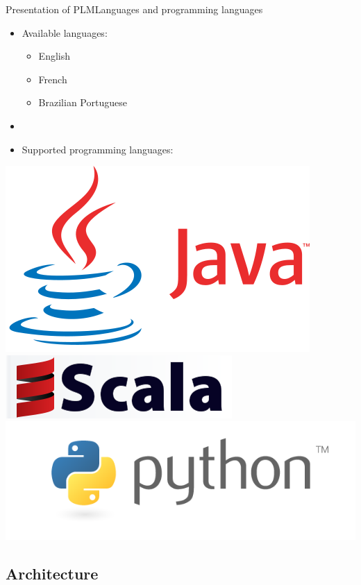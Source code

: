 \documentclass{beamer}
\begin{document}
\begin{frame}{Presentation of PLM}{Languages and programming languages}
  \begin{itemize}
    \item {
      Available languages:
      \begin{itemize}
      \item English
      \item French
      \item Brazilian Portuguese
      \end{itemize}
    }
    \item[~]
    \item {
      Supported programming languages:
    }
  \end{itemize}
  \begin{center}
    \includegraphics[scale=0.16]{img/java.png}
    ~
    \includegraphics[scale=0.4]{img/scala.png}
    \includegraphics[scale=0.18]{img/python.png}
  \end{center}
\end{frame}

\subsection{Architecture}
\end{document}
